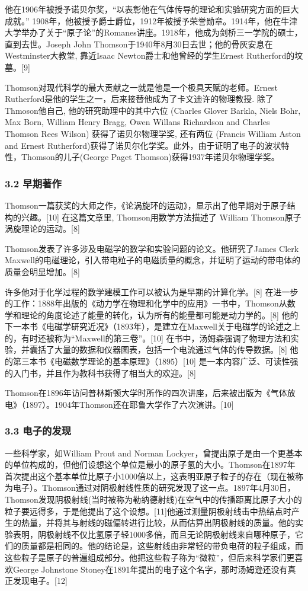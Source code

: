 他在1906年被授予诺贝尔奖，“以表彰他在气体传导的理论和实验研究方面的巨大成就。” 1908年，他被授予爵士爵位，1912年被授予荣誉勋章。1914年，他在牛津大学举办了关于“原子论”的Romanes讲座。1918年，他成为剑桥三一学院的硕士，直到去世。Joseph John Thomson于1940年8月30日去世；他的骨灰安息在Westminster大教堂, 靠近Isaac Newton爵士和他曾经的学生Ernest Rutherford的坟墓。[9]

Thomson对现代科学的最大贡献之一就是他是一个极具天赋的老师。Ernest Rutherford是他的学生之一，后来接替他成为了卡文迪许的物理教授. 除了Thmoson他自己, 他的研究助理中的其中六位 (Charles Glover Barkla, Niels Bohr, Max Born, William Henry Bragg, Owen Willans Richardson and Charles Thomson Rees Wilson) 获得了诺贝尔物理学奖, 还有两位 (Francis William Aston and Ernest Rutherford)获得了诺贝尔化学奖。此外，由于证明了电子的波状特性，Thomson的儿子(George Paget Thomson)获得1937年诺贝尔物理学奖。

\subsubsection{3.2 早期著作}
Thomson一篇获奖的大师之作，《论涡旋环的运动》，显示出了他早期对于原子结构的兴趣。[10] 在这篇文章里, Thomson用数学方法描述了 William Thomson原子涡旋理论的运动。[8]

Thomson发表了许多涉及电磁学的数学和实验问题的论文。他研究了James Clerk Maxwell的电磁理论，引入带电粒子的电磁质量的概念，并证明了运动的带电体的质量会明显增加。[8]

许多他对于化学过程的数学建模工作可以被认为是早期的计算化学。[8] 在进一步的工作：1888年出版的《动力学在物理和化学中的应用》一书中，Thomson从数学和理论的角度论述了能量的转化，认为所有的能量都可能是动力学的。[8] 他的下一本书《电磁学研究近况》（1893年），是建立在Maxwell关于电磁学的论述之上的，有时还被称为“Maxwell的第三卷”。[10] 在书中，汤姆森强调了物理方法和实验，并囊括了大量的数据和仪器图表，包括一个电流通过气体的传导数据。[8] 他的第三本书《电磁数学理论的基本原理》（1895）[10] 是一本内容广泛、可读性强的入门书，并且作为教科书获得了相当大的欢迎。[8]

Thomson在1896年访问普林斯顿大学时所作的四次讲座，后来被出版为《气体放电》（1897）。1904年Thomson还在耶鲁大学作了六次演讲。[10]

\subsubsection{3.3 电子的发现}
一些科学家，如William Prout and Norman Lockyer，曾提出原子是由一个更基本的单位构成的，但他们设想这个单位是最小的原子氢的大小。Thomson在1897年首次提出这个基本单位比原子小1000倍以上，这表明亚原子粒子的存在（现在被称为电子）。Thomson通过对阴极射线性质的研究发现了这一点。1897年4月30日，Thomson发现阴极射线(当时被称为勒纳德射线)在空气中的传播距离比原子大小的粒子要远得多，于是他提出了这个设想。[11]他通过测量阴极射线击中热结点时产生的热量，并将其与射线的磁偏转进行比较，从而估算出阴极射线的质量。他的实验表明，阴极射线不仅比氢原子轻1000多倍，而且无论阴极射线来自哪种原子，它们的质量都是相同的。他的结论是，这些射线由非常轻的带负电荷的粒子组成，而这些粒子是原子的普遍组成部分。他把这些粒子称为“微粒”，但后来科学家们更喜欢George Johnstone Stoney在1891年提出的电子这个名字，那时汤姆逊还没有真正发现电子。[12]

